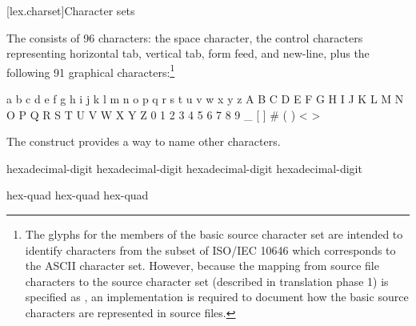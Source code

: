 [lex.charset]{Character sets}

\pnum
{}%
The  consists of 96 characters: the space character,
the control characters representing horizontal tab, vertical tab, form feed, and
new-line, plus the following 91 graphical characters:\footnote{The glyphs for
the members of the basic source character set are intended to
identify characters from the subset of ISO/IEC 10646 which corresponds to the ASCII
character set. However, because the mapping from source file characters to the source
character set (described in translation phase 1) is specified as
,
an implementation is required to document how the basic source characters are
represented in source files.}
\begin{codeblock}
a b c d e f g h i j k l m n o p q r s t u v w x y z
A B C D E F G H I J K L M N O P Q R S T U V W X Y Z
0 1 2 3 4 5 6 7 8 9
_ { } [ ] # ( ) < > %
\end{codeblock}

\pnum
The  construct provides a way to name
other characters.

\begin{bnf}
\br
    hexadecimal-digit hexadecimal-digit hexadecimal-digit hexadecimal-digit
\end{bnf}

\begin{bnf}
\br
     hex-quad\br
     hex-quad hex-quad
\end{bnf}

